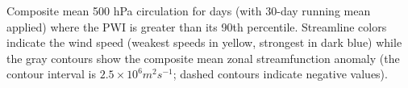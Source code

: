 \label{fig:pwi_spatial_summary}
Composite mean 500 hPa circulation for days (with 30-day running mean applied) where the PWI is greater than its 90th percentile. Streamline colors indicate the wind speed (weakest speeds in yellow, strongest in dark blue) while the gray contours show the composite mean zonal streamfunction anomaly (the contour interval is $2.5 \times 10^6 m^2 s^{-1}$; dashed contours indicate negative values). 